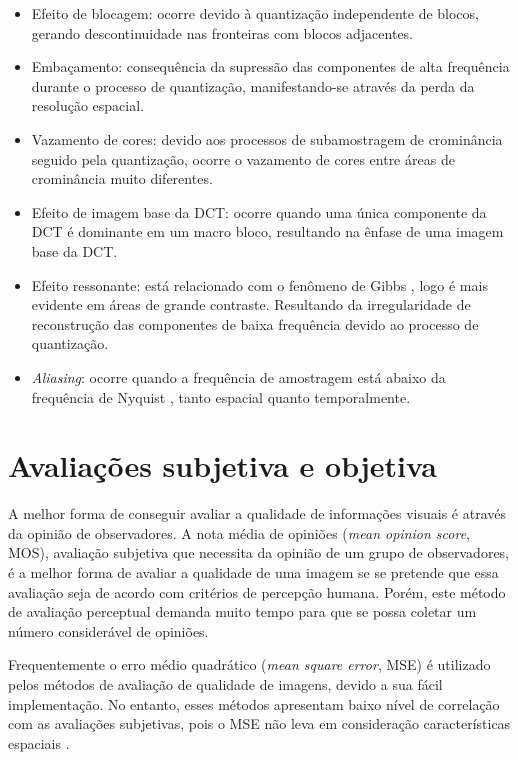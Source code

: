\begin{itemize}
\item Efeito de blocagem: ocorre devido à quantização independente de blocos, gerando descontinuidade nas fronteiras com blocos adjacentes.
\item Embaçamento: consequência da supressão das componentes de alta frequência durante o processo de quantização, manifestando-se através da perda da resolução espacial.
\item Vazamento de cores: devido aos processos de subamostragem de crominância seguido pela quantização, ocorre o vazamento de cores entre áreas de crominância muito diferentes.
\item Efeito de imagem base da DCT: ocorre quando uma única componente da DCT é dominante em um macro bloco, resultando na ênfase de uma imagem base da DCT.
\item Efeito ressonante: está relacionado com o fenômeno de Gibbs \cite{Gonzalez2006}, logo é mais evidente em áreas de grande contraste. Resultando da irregularidade de reconstrução das componentes de baixa frequência devido ao processo de quantização.
\item \textit{Aliasing}: ocorre quando a frequência de amostragem está abaixo da frequência de Nyquist \cite{Gonzalez2006}, tanto espacial quanto temporalmente.
\end{itemize}

\section{Avaliações subjetiva e objetiva}
\label{ava_subj_obj}

A melhor forma de conseguir avaliar a qualidade de informações visuais é através da opinião de observadores. A nota média de opiniões (\textit{mean opinion score}, MOS), avaliação subjetiva que necessita da opinião de um grupo de observadores, é a melhor forma de avaliar a qualidade de uma imagem se se pretende que essa avaliação seja de acordo com critérios de percepção humana. Porém, este método de avaliação perceptual demanda muito tempo para que se possa coletar um número considerável de opiniões.

Frequentemente o erro médio quadrático (\textit{mean square error}, MSE) é utilizado pelos métodos de avaliação de qualidade de imagens, devido a sua fácil implementação. No entanto, esses métodos apresentam baixo nível de correlação com as avaliações subjetivas, pois o MSE não leva em consideração características espaciais \cite{Wang2006}.

